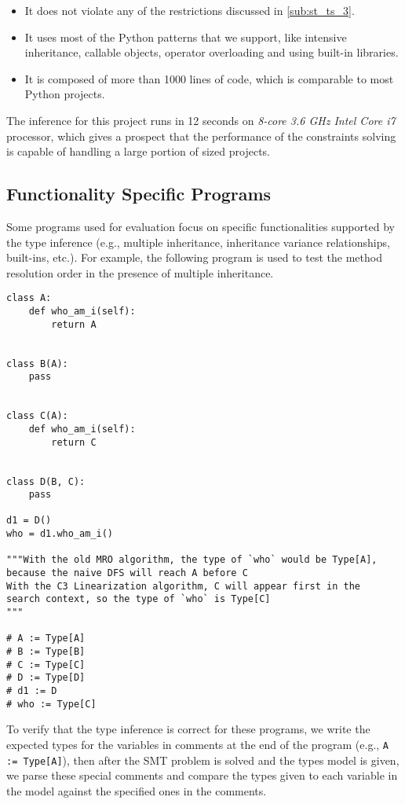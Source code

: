 \begin{itemize}
	\item It does not violate any of the restrictions discussed in \ref{sub:st_ts_3}.
	\item It uses most of the Python patterns that we support, like intensive inheritance, callable objects, operator overloading and using built-in libraries.
	\item It is composed of more than 1000 lines of code, which is comparable to most Python projects.
\end{itemize}
The inference for this project runs in 12 seconds on \textit{8-core 3.6 GHz Intel Core i7} processor, which gives a prospect that the performance of the constraints solving is capable of handling a large portion of sized projects.

\subsection{Functionality Specific Programs}
Some programs used for evaluation focus on specific functionalities supported by the type inference (e.g., multiple inheritance, inheritance variance relationships, built-ins, etc.). For example, the following program is used to test the method resolution order in the presence of multiple inheritance.
\begin{lstlisting}
class A:
	def who_am_i(self):
		return A


class B(A):
	pass


class C(A):
	def who_am_i(self):
		return C


class D(B, C):
	pass

d1 = D()
who = d1.who_am_i()

"""With the old MRO algorithm, the type of `who` would be Type[A],
because the naive DFS will reach A before C
With the C3 Linearization algorithm, C will appear first in the
search context, so the type of `who` is Type[C]
"""

# A := Type[A]
# B := Type[B]
# C := Type[C]
# D := Type[D]
# d1 := D
# who := Type[C]
\end{lstlisting}

To verify that the type inference is correct for these programs, we write the expected types for the variables in comments at the end of the program (e.g., \lstinline|A := Type[A]|), then after the SMT problem is solved and the types model is given, we parse these special comments and compare the types given to each variable in the model against the specified ones in the comments.
